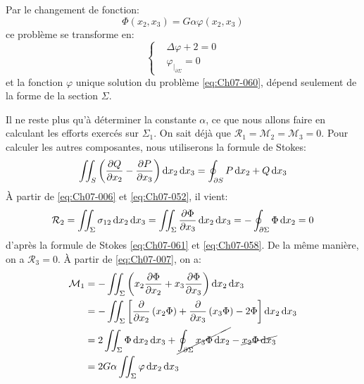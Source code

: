 Par le changement de fonction:
\begin{equation}
    \Phi \left( x_2, x_3 \right) = G \alpha \varphi \left( x_2, x_3 \right)
    \label{eq:Ch07-059}
\end{equation}
ce problème se transforme en:
\begin{equation}
    \left\{
    \begin{aligned}
        & \Delta \varphi + 2 = 0 \\
        & \varphi_{|_{\partial \Sigma}} = 0
    \end{aligned}
    \right.
    \label{eq:Ch07-060}
\end{equation}
et la fonction $\varphi$ unique solution du problème \eqref{eq:Ch07-060}, dépend seulement de la forme de la section $\Sigma$.

Il ne reste plus qu'à déterminer la constante $\alpha$, ce que nous allons faire en calculant les efforts exercés sur $\Sigma_1$.
On sait déjà que $\mathcal{R}_1 = \mathcal{M}_2 = \mathcal{M}_3 = 0$.
Pour calculer les autres composantes, nous utiliserons la formule de Stokes:
\begin{equation}
    \iint_{S} \left( \frac{\partial Q}{\partial x_2} - \frac{\partial P}{\partial x_3} \right) \mathop{\mathrm{{}d}}\mathopen{} x_2 \mathop{\mathrm{{}d}}\mathopen{} x_3 = \oint_{\partial S} P \mathop{\mathrm{{}d}}\mathopen{} x_2 + Q \mathop{\mathrm{{}d}}\mathopen{} x_3
    \label{eq:Ch07-061}
\end{equation}
\`A partir de \eqref{eq:Ch07-006} et \eqref{eq:Ch07-052}, il vient:
\begin{equation}
    \mathcal{R}_2 = \iint_{\Sigma} \sigma_{12} \mathop{\mathrm{{}d}}\mathopen{} x_2 \mathop{\mathrm{{}d}}\mathopen{} x_3 = \iint_{\Sigma} \frac{\partial \Phi}{\partial x_3} \mathop{\mathrm{{}d}}\mathopen{} x_2 \mathop{\mathrm{{}d}}\mathopen{} x_3 = - \oint_{\partial \Sigma} \Phi \mathop{\mathrm{{}d}}\mathopen{} x_2 = 0
    \label{eq:Ch07-062}
\end{equation}
d'après la formule de Stokes \eqref{eq:Ch07-061} et \eqref{eq:Ch07-058}.
De la même manière, on a $\mathcal{R}_3 = 0$.
\`A partir de \eqref{eq:Ch07-007}, on a:
\begin{equation}
    \begin{aligned}
        \mathcal{M}_1 &= -\iint_{\Sigma} \left( x_2 \frac{\partial \Phi}{\partial x_2} + x_3 \frac{\partial \Phi}{\partial x_3} \right) \mathop{\mathrm{{}d}}\mathopen{} x_2 \mathop{\mathrm{{}d}}\mathopen{} x_3 \\
        &= -\iint_{\Sigma} \left[ \frac{\partial}{\partial x_2} \left( x_2 \Phi \right) + \frac{\partial}{\partial x_3} \left( x_3 \Phi \right) - 2\Phi \right] \mathop{\mathrm{{}d}}\mathopen{} x_2 \mathop{\mathrm{{}d}}\mathopen{} x_3 \\
        &= 2 \iint_{\Sigma} \Phi \mathop{\mathrm{{}d}}\mathopen{} x_2 \mathop{\mathrm{{}d}}\mathopen{} x_3 + \cancel{\oint_{\partial \Sigma} x_3 \Phi \mathop{\mathrm{{}d}}\mathopen{} x_2} - \cancel{x_2 \Phi \mathop{\mathrm{{}d}}\mathopen{} x_3} \\
        &= 2 G \alpha \iint_{\Sigma} \varphi \mathop{\mathrm{{}d}}\mathopen{} x_2 \mathop{\mathrm{{}d}}\mathopen{} x_3
    \end{aligned}
    \label{eq:Ch07-063}
\end{equation}
